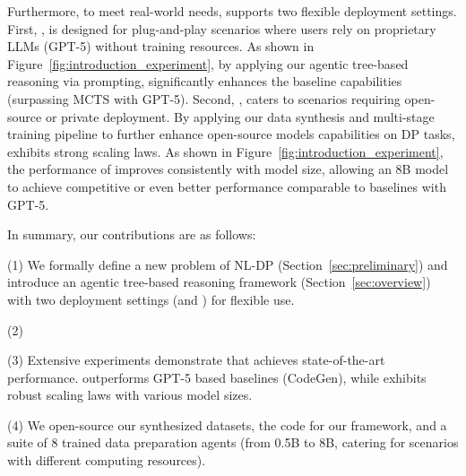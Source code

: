 Furthermore, to meet real-world needs, \sys supports two flexible deployment settings.
First, \textbf{\sysp}, is designed for {plug-and-play} scenarios where users rely on proprietary LLMs (\eg GPT-5) without training resources. As shown in Figure~\ref{fig:introduction_experiment}, by applying our agentic tree-based reasoning via prompting, \sysp significantly enhances the baseline capabilities (surpassing MCTS with GPT-5). 
Second, \textbf{\syst}, caters to scenarios requiring {open-source or private} deployment. By applying our data synthesis and multi-stage training pipeline to further enhance open-source models capabilities on DP tasks, \syst exhibits strong {scaling laws}. As shown in Figure~\ref{fig:introduction_experiment}, the performance of \syst improves consistently with model size, allowing an 8B model to achieve competitive or even better performance comparable to baselines with GPT-5.

In summary, our contributions are as follows:

    (1) We formally define a new problem of NL-\nlwhat DP (Section~\ref{sec:preliminary}) and introduce an agentic tree-based reasoning framework \sys (Section~\ref{sec:overview}) with two deployment settings (\sysp and \syst) for flexible use.
    
    
    (2) 
    
    (3) Extensive experiments demonstrate that \sys achieves state-of-the-art performance. \sysp outperforms GPT-5 based baselines (\eg CodeGen), while \syst exhibits robust scaling laws with various model sizes.

    (4)  We open-source our synthesized datasets, the code for our framework, and a suite of 8 trained data preparation agents (from 0.5B to 8B, catering for scenarios with different computing resources).
